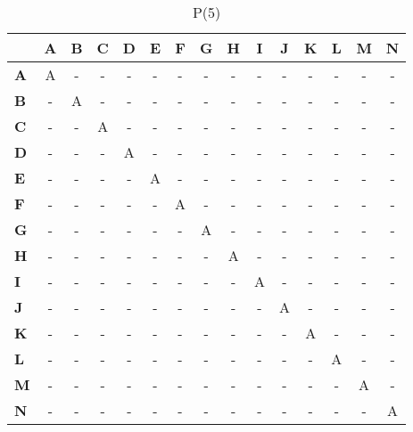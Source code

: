 \documentclass{article}
\begin{document}
\begin{table}[H]\centering
\caption{P(5)}
\begin{tabular}{l c c c c c c c c c c c c c c}
\toprule
 & \textbf{A} & \textbf{B} & \textbf{C} & \textbf{D} & \textbf{E} & \textbf{F} & \textbf{G} & \textbf{H} & \textbf{I} & \textbf{J} & \textbf{K} & \textbf{L} & \textbf{M} & \textbf{N}\\\midrule
\textbf{A} & A & - & - & - & - & - & - & - & - & - & - & - & - & - \\
\textbf{B} & - & A & - & - & - & - & - & - & - & - & - & - & - & - \\
\textbf{C} & - & - & A & - & - & - & - & - & - & - & - & - & - & - \\
\textbf{D} & - & - & - & A & - & - & - & - & - & - & - & - & - & - \\
\textbf{E} & - & - & - & - & A & - & - & - & - & - & - & - & - & - \\
\textbf{F} & - & - & - & - & - & A & - & - & - & - & - & - & - & - \\
\textbf{G} & - & - & - & - & - & - & A & - & - & - & - & - & - & - \\
\textbf{H} & - & - & - & - & - & - & - & A & - & - & - & - & - & - \\
\textbf{I} & - & - & - & - & - & - & - & - & A & - & - & - & - & - \\
\textbf{J} & - & - & - & - & - & - & - & - & - & A & - & - & - & - \\
\textbf{K} & - & - & - & - & - & - & - & - & - & - & A & - & - & - \\
\textbf{L} & - & - & - & - & - & - & - & - & - & - & - & A & - & - \\
\textbf{M} & - & - & - & - & - & - & - & - & - & - & - & - & A & - \\
\textbf{N} & - & - & - & - & - & - & - & - & - & - & - & - & - & A \\
\bottomrule
\end{tabular}
\end{table}
\end{document}
